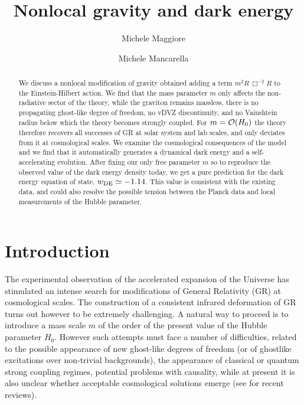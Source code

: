 \documentclass[aps,prd,twocolumn,superscriptaddress,nofootinbib]{revtex4}
\begin{document}
\title{Nonlocal gravity and dark energy}


\author{Michele Maggiore}  


\author{Michele Mancarella}

\begin{abstract}

We discuss a nonlocal modification of gravity obtained adding a term $m^2 R\,\Box^{-2}R$ to the Einstein-Hilbert action. We find that the  mass parameter $m$ only affects the non-radiative sector of the theory, while the graviton remains massless, there is no propagating ghost-like degree of freedom, no vDVZ discontinuity, and  no Vainshtein radius below which the theory becomes strongly coupled.
For $m={\cal O}(H_0)$ the theory therefore recovers all successes of GR at solar system and lab scales, and only deviates from it at cosmological scales.  We examine the cosmological consequences of the model and we find that it  automatically  generates a dynamical dark energy and a self-accelerating evolution. After fixing our only free parameter $m$ so to reproduce the observed value of the dark energy density today, we get a pure prediction for the dark energy equation of state,
$w_ {\rm DE}\simeq-1.14$. This value is consistent with the existing data,  and could also resolve the possible tension between the Planck data and local measurements of the Hubble parameter.

\end{abstract}


\maketitle







\section{Introduction}

The experimental observation of the accelerated expansion of the Universe
\cite{Riess:1998cb,Perlmutter:1998np} has stimulated an intense search for modifications of General Relativity (GR) at cosmological scales. The construction of a consistent infrared deformation of GR turns out however to be extremely challenging. A natural way to proceed is to introduce a mass scale $m$ of the order of the present value of the Hubble parameter $H_0$. However such attempts must face a number of difficulties, related to the possible appearance of new ghost-like degrees of freedom (or of ghostlike excitations over non-trivial backgrounds), the appearance of classical or quantum strong coupling regimes, potential problems with causality, while 
at present it is also unclear whether acceptable cosmological solutions emerge
 (see \cite{Hinterbichler:2011tt,deRham:2014zqa} for  recent  reviews). 
 
\end{document}
